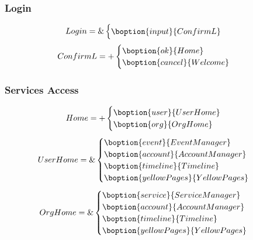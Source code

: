 \subsubsection{Login}
\label{sec:login}



\begin{align}
  Login &= \&
              \begin{cases}
                \boption{input}{ConfirmL}
              \end{cases}
\end{align}
%
\begin{align}
  ConfirmL &= +
             \begin{cases}
               \boption{ok}{Home}\\
               \boption{cancel}{Welcome}
             \end{cases}
\end{align}
%

\subsubsection{Services Access}
\label{sec:services-access}


\begin{align}
  Home &= +
         \begin{cases}
           \boption{user}{UserHome}\\
           \boption{org}{OrgHome}
         \end{cases}
\end{align}
%
\begin{align}
  UserHome &= \&
                 \begin{cases}
                   \boption{event}{EventManager}\\
                   \boption{account}{AccountManager}\\
                   \boption{timeline}{Timeline}\\
                   \boption{yellowPages}{YellowPages}
                 \end{cases}
\end{align}
%
\begin{align}
  OrgHome &= \&
                \begin{cases}
                  \boption{service}{ServiceManager}\\
                  \boption{account}{AccountManager}\\
                  \boption{timeline}{Timeline}\\
                  \boption{yellowPages}{YellowPages}
                \end{cases}
\end{align}
%

